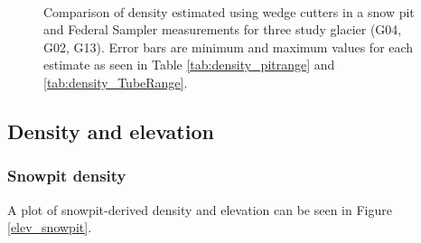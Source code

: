\documentclass[12pt]{article}
\begin{document}
\begin{figure} 
	\centering
	\\
	\caption{Comparison of density estimated using wedge cutters in a snow pit and Federal Sampler measurements for three study glacier (G04, G02, G13). Error bars are minimum and maximum values for each estimate as seen in Table \ref{tab:density_pitrange} and \ref{tab:density_TubeRange}.}
	\label{fig:density_pitVStube}
\end{figure}


\subsection*{Density and elevation}

\subsubsection*{Snowpit density}

A plot of snowpit-derived density and elevation can be seen in Figure \ref{elev_snowpit}. 
\end{document}
